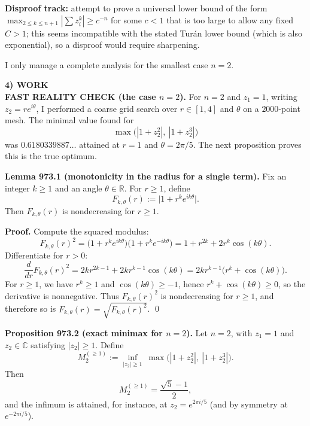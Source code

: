 \textbf{Disproof track:} attempt to prove a universal lower bound of the form $\max_{2\le k\le n+1}|\sum z_i^k|\ge c^{-n}$ for some $c<1$ that is too large to allow any fixed $C>1$; this seems incompatible with the stated Tur\'an lower bound (which is also exponential), so a disproof would require sharpening.

I only manage a complete analysis for the smallest case $n=2$.

\medskip
\noindent\textbf{4) WORK}\\
\textbf{FAST REALITY CHECK (the case $n=2$).}  For $n=2$ and $z_1=1$, writing $z_2=re^{i\theta}$, I performed a coarse grid search over $r\in[1,4]$ and $\theta$ on a $2000$-point mesh.  The minimal value found for
\[
\max\big(|1+z_2^2|,\ |1+z_2^3|\big)
\]
was $0.6180339887\dots$ attained at $r=1$ and $\theta=2\pi/5$.
The next proposition proves this is the true optimum.

\medskip
\noindent\textbf{Lemma 973.1 (monotonicity in the radius for a single term).}\label{lem:973-radius}
Fix an integer $k\ge 1$ and an angle $\theta\in\mathbb{R}$.  For $r\ge 1$, define
\[
F_{k,\theta}(r):=\big|1+r^k e^{ik\theta}\big|.
\]
Then $F_{k,\theta}(r)$ is nondecreasing for $r\ge 1$.

\noindent\textbf{Proof.}
Compute the squared modulus:
\[
F_{k,\theta}(r)^2 = \big(1+r^k e^{ik\theta}\big)\big(1+r^k e^{-ik\theta}\big)=1+r^{2k}+2r^k\cos(k\theta).
\]
Differentiate for $r>0$:
\[
\frac{d}{dr}F_{k,\theta}(r)^2 = 2k r^{2k-1} + 2k r^{k-1}\cos(k\theta)
=2k r^{k-1}\big(r^k+\cos(k\theta)\big).
\]
For $r\ge 1$, we have $r^k\ge 1$ and $\cos(k\theta)\ge -1$, hence $r^k+\cos(k\theta)\ge 0$, so the derivative is nonnegative.
Thus $F_{k,\theta}(r)^2$ is nondecreasing for $r\ge 1$, and therefore so is $F_{k,\theta}(r)=\sqrt{F_{k,\theta}(r)^2}$. \qed

\medskip
\noindent\textbf{Proposition 973.2 (exact minimax for $n=2$).}\label{prop:973-n2}
Let $n=2$, with $z_1=1$ and $z_2\in\mathbb{C}$ satisfying $|z_2|\ge 1$.
Define
\[
M_2^{(\ge 1)}:=\inf_{|z_2|\ge 1}\ \max\big(|1+z_2^2|,\ |1+z_2^3|\big).
\]
Then
\[
M_2^{(\ge 1)}=\frac{\sqrt5-1}{2},
\]
and the infimum is attained, for instance, at $z_2=e^{2\pi i/5}$ (and by symmetry at $e^{-2\pi i/5}$).

